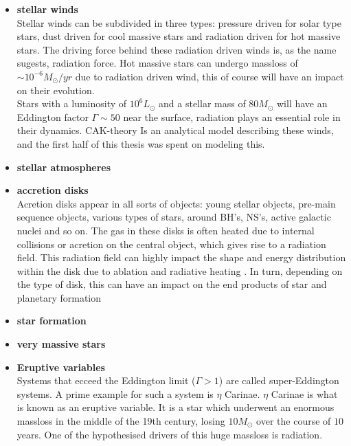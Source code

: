 \begin{itemize}
\item \textbf{stellar winds}\\
Stellar winds can be subdivided in three types: pressure driven for solar type stars, dust driven for cool massive stars and radiation driven for hot massive stars. The driving force behind these radiation driven winds is, as the name sugests, radiation force. Hot massive stars can undergo massloss of $\sim 10^{-6} M_\odot/yr$ due to radiation driven wind, this of course will have an impact on their evolution. \\
Stars with a luminosity of $10^6 L_\odot$ and a stellar mass of $80 M_\odot$ will have an Eddington factor $\Gamma \sim 50$ near the surface, radiation plays an essential role in their dynamics.
CAK-theory Is an analytical model describing these winds, and the first half of this thesis was spent on modeling this.\\

\item \textbf{stellar atmospheres}\\

\item \textbf{accretion disks}\\
Acretion disks appear in all sorts of objects: young stellar objects, pre-main sequence objects, various types of stars, around BH's, NS's, active galactic nuclei and so on. The gas in these disks is often heated due to internal collisions or acretion on the central object, which gives rise to a radiation field. This radiation field can highly impact the shape and energy distribution within the disk due to ablation and radiative heating \cite{dylan}. In turn, depending on the type of disk, this can have an impact on the end products of star and planetary formation

\item \textbf{star formation}\\

\item \textbf{very massive stars}\\

\item \textbf{Eruptive variables}\\
Systems that ecceed the Eddington limit ($\Gamma > 1$) are called super-Eddington systems. A prime example for such a system is $\eta$ Carinae. $\eta$ Carinae is what is known as an eruptive variable. It is a star which underwent an enormous massloss in the middle of the 19th century, losing $10 M_\odot$ over the course of $10$ years. One of the hypothesised drivers of this huge massloss is radiation.
\end{itemize}




